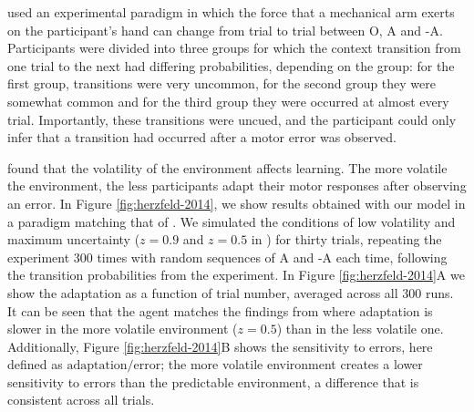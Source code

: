 \documentclass[a4paper,doc,floatsintext,natbib]{apa6}
\def \fref #1{Figure \ref{#1}}     %
\begin{document}
\cite{Herzfeld_memory_2014} used an experimental paradigm in which the force that a mechanical arm exerts on the participant's hand can change from trial to trial between O, A and -A. Participants were divided into three groups for which the context transition from one trial to the next had differing probabilities, depending on the group: for the first group, transitions were very uncommon, for the second group they were somewhat common and for the third group they were occurred at almost every trial. Importantly, these transitions were uncued, and the participant could only infer that a transition had occurred after a motor error was observed.

\cite{Herzfeld_memory_2014} found that the volatility of the environment affects learning. The more volatile the environment, the less participants adapt their motor responses after observing an error. In \fref{fig:herzfeld-2014}, we show results obtained with our model in a paradigm matching that of \cite{Herzfeld_memory_2014}. We simulated the conditions of low volatility and maximum uncertainty ($z = 0.9$ and $z = 0.5$ in \cite{Herzfeld_memory_2014}) for thirty trials, repeating the experiment 300 times with random sequences of A and -A each time, following the transition probabilities from the experiment. In \fref{fig:herzfeld-2014}A we show the adaptation as a function of trial number, averaged across all 300 runs. It can be seen that the agent matches the findings from \cite{Herzfeld_memory_2014} where adaptation is slower in the more volatile environment ($z = 0.5$) than in the less volatile one. Additionally, \fref{fig:herzfeld-2014}B shows the sensitivity to errors, here defined as $\text{adaptation} / \text{error}$; the more volatile environment creates a lower sensitivity to errors than the predictable environment, a difference that is consistent across all trials.
\end{document}
